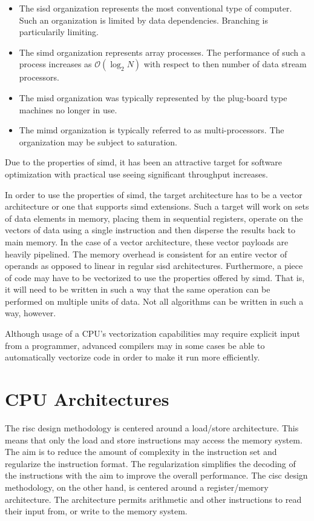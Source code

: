 \begin{itemize}
    \item The \gls{sisd} organization represents the most conventional type of computer. Such an organization is limited by data dependencies. Branching is particularily limiting.
    \item The \gls{simd} organization represents array processes. The performance of such a process increases as $\mathcal{O}(\log_2 N)$ with respect to then number of data stream processors. 
    \item The \gls{misd} organization was typically represented by the plug-board type machines no longer in use.
    \item The \gls{mimd} organization is typically referred to as multi-processors. The organization may be subject to saturation.
\end{itemize}

Due to the properties of \gls{simd}, it has been an attractive target for software optimization with practical use seeing significant throughput increases\cite{dickson2011}.

In order to use the properties of \gls{simd}, the target architecture has to be a vector architecture or one that supports \gls{simd} extensions. Such a target will work on sets of data elements in memory, placing them in sequential registers, operate on the vectors of data using a single instruction and then disperse the results back to main memory. In the case of a vector architecture, these vector payloads are heavily pipelined. The memory overhead is consistent for an entire vector of operands as opposed to linear in regular \gls{sisd} architectures\cite{hennessy2011:vectorization}. Furthermore, a piece of code may have to be vectorized to use the properties offered by \gls{simd}. That is, it will need to be written in such a way that the same operation can be performed on multiple units of data. Not all algorithms can be written in such a way, however\cite{dickson2011}.

Although usage of a CPU's vectorization capabilities may require explicit input from a programmer, advanced compilers may in some cases be able to automatically vectorize code in order to make it run more efficiently\cite{dickson2011}.

\section{CPU Architectures}

The \acrfull{risc} design methodology is centered around a load/store architecture\cite{flynn1998}. This means that only the load and store instructions may access the memory system\cite{carter2002}. The aim is to reduce the amount of complexity in the instruction set and regularize the instruction format. The regularization simplifies the decoding of the instructions with the aim to improve the overall performance\cite{flynn1998}. The \acrfull{cisc} design methodology, on the other hand, is centered around a register/memory architecture\cite{flynn1998}. The architecture permits arithmetic and other instructions to read their input from, or write to the memory system\cite{carter2002}.

